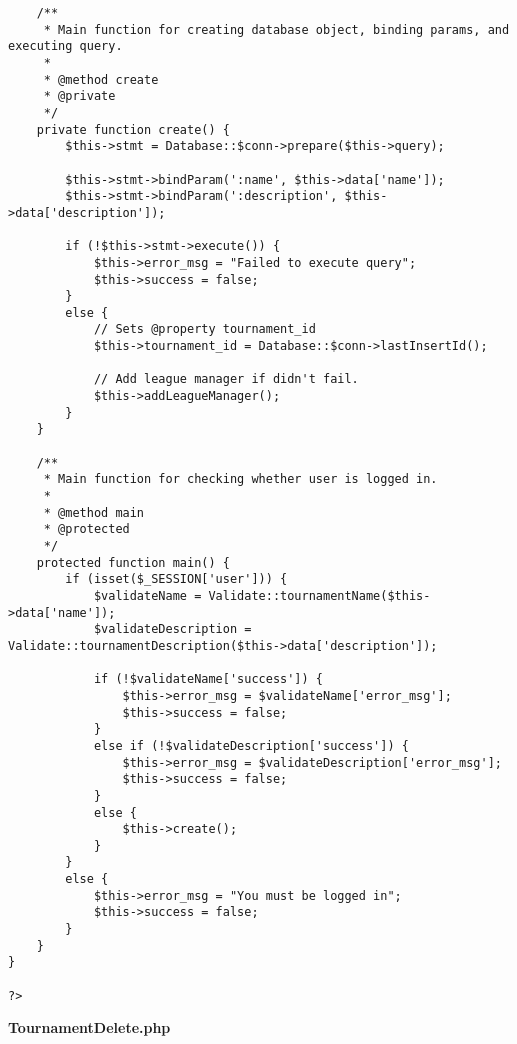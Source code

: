 {\begin{lstlisting}
	/**
	 * Main function for creating database object, binding params, and executing query.
	 *
	 * @method create
	 * @private
	 */
	private function create() {
		$this->stmt = Database::$conn->prepare($this->query);

		$this->stmt->bindParam(':name', $this->data['name']);
		$this->stmt->bindParam(':description', $this->data['description']);

		if (!$this->stmt->execute()) {
			$this->error_msg = "Failed to execute query";
			$this->success = false;
		}
		else {
			// Sets @property tournament_id
			$this->tournament_id = Database::$conn->lastInsertId();

			// Add league manager if didn't fail.
			$this->addLeagueManager();
		}
	}

	/**
	 * Main function for checking whether user is logged in.
	 *
	 * @method main
	 * @protected
	 */
	protected function main() {
		if (isset($_SESSION['user'])) {
			$validateName = Validate::tournamentName($this->data['name']);
			$validateDescription = Validate::tournamentDescription($this->data['description']);

			if (!$validateName['success']) {
				$this->error_msg = $validateName['error_msg'];
				$this->success = false;
			}
			else if (!$validateDescription['success']) {
				$this->error_msg = $validateDescription['error_msg'];
				$this->success = false;
			}
			else {
				$this->create();
			}
		}
		else {
			$this->error_msg = "You must be logged in";
			$this->success = false;
		}
	}
}

?>\end{lstlisting}
}
\textbf{TournamentDelete.php}\label{TournamentDelete.php}


